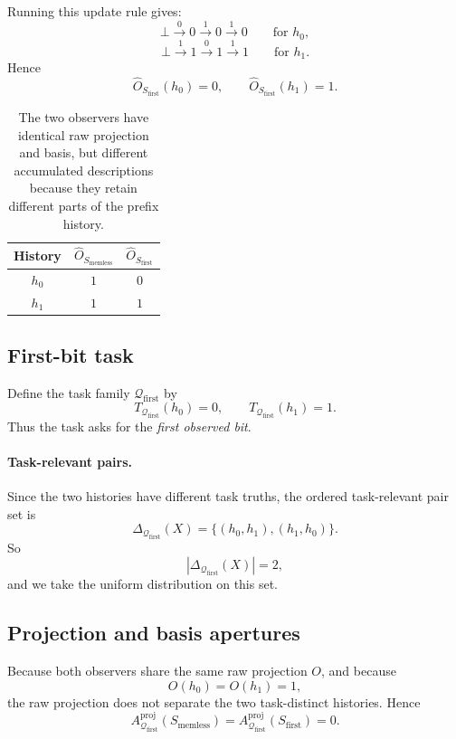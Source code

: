 \documentclass[11pt,twoside]{article}
\newcommand{\TableHeaderRow}{\rowcolor{tableheaderbg}\bfseries}
\theoremstyle{definition}
\newcommand{\proj}{\mathrm{proj}}
\begin{document}
Running this update rule gives:
\[
  \bot \xrightarrow{0} 0 \xrightarrow{1} 0 \xrightarrow{1} 0
  \qquad \text{for } h_0,
\]
\[
  \bot \xrightarrow{1} 1 \xrightarrow{0} 1 \xrightarrow{1} 1
  \qquad \text{for } h_1.
\]
Hence
\[
  \widehat{O}_{S_{\mathrm{first}}}(h_0)=0,
  \qquad
  \widehat{O}_{S_{\mathrm{first}}}(h_1)=1.
\]

\begin{table}[t]
\centering
\begin{tabular}{c c c}
\toprule
\TableHeaderRow
History & \(\widehat{O}_{S_{\mathrm{memless}}}\) & \(\widehat{O}_{S_{\mathrm{first}}}\) \\
\midrule
\(h_0\) & \(1\) & \(0\) \\
\(h_1\) & \(1\) & \(1\) \\
\bottomrule
\end{tabular}
\caption{The two observers have identical raw projection and basis, but different accumulated descriptions because they retain different parts of the prefix history.}
\label{tab:memory-observer-outputs}
\end{table}

\subsection{First-bit task}
\label{app:first-bit-task}

Define the task family \(\mathcal{Q}_{\mathrm{first}}\) by
\[
  T_{\mathcal{Q}_{\mathrm{first}}}(h_0)=0,
  \qquad
  T_{\mathcal{Q}_{\mathrm{first}}}(h_1)=1.
\]
Thus the task asks for the \emph{first observed bit}.

\paragraph{Task-relevant pairs.}
Since the two histories have different task truths, the ordered task-relevant pair set is
\[
  \Delta_{\mathcal{Q}_{\mathrm{first}}}(X)
  =
  \{ (h_0,h_1), (h_1,h_0) \}.
\]
So
\[
  |\Delta_{\mathcal{Q}_{\mathrm{first}}}(X)|=2,
\]
and we take the uniform distribution on this set.

\subsection{Projection and basis apertures}
\label{app:memory-proj-basis-apertures}

Because both observers share the same raw projection \(O\), and because
\[
  O(h_0)=O(h_1)=1,
\]
the raw projection does not separate the two task-distinct histories. Hence
\[
  A^{\proj}_{\mathcal{Q}_{\mathrm{first}}}(S_{\mathrm{memless}})
  =
  A^{\proj}_{\mathcal{Q}_{\mathrm{first}}}(S_{\mathrm{first}})
  =
  0.
\]
\end{document}
